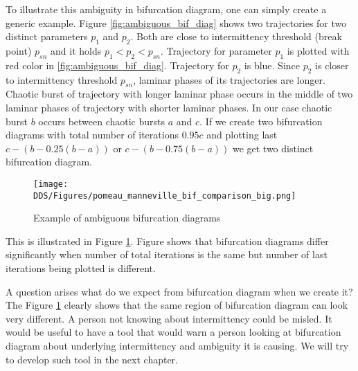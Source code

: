 To illustrate this ambiguity in bifurcation diagram, one can simply create a generic example.
Figure \ref{fig:ambiguous_bif_diag} shows two trajectories for two distinct parameters $p_1$ and $p_2$.
Both are close to intermittency threshold (break point) $p_{sn}$ and it holds $p_1 < p_2 < p_{sn}$.
Trajectory for parameter $p_1$ is plotted with red color in \ref{fig:ambiguous_bif_diag}.
Trajectory for $p_2$ is blue.
Since $p_2$ is closer to intermittency threshold $p_{sn}$, laminar phases of its trajectories are longer.
Chaotic burst of trajectory with longer laminar phase occurs in the middle of two laminar phases of trajectory with shorter laminar phases.
In our case chaotic burst $b$ occurs between chaotic bursts $a$ and $c$.
If we create two bifurcation diagrams with total number of iterations $0.95 c$ and plotting last $c-(b-0.25(b-a))$ or $c-(b-0.75(b-a))$ we get two distinct bifurcation diagram.


\begin{figure}[!h]
    \centering
    \texttt{[image: DDS/Figures/pomeau\_manneville\_bif\_comparison\_big.png]}
    \caption{Example of ambiguous bifurcation diagrams}
    \label{fig:ambiguous_bif_diag_example}
\end{figure}

This is illustrated in Figure \ref{fig:ambiguous_bif_diag_example}.
Figure shows that bifurcation diagrams differ significantly when number of total iterations is the same but number of last iterations being plotted is different.
\par
A question arises what do we expect from bifurcation diagram when we create it?
The Figure \ref{fig:ambiguous_bif_diag_example} clearly shows that the same region of bifurcation diagram can look very different.
A person not knowing about intermittency could be misled.
It would be useful to have a tool that would warn a person looking at bifurcation diagram about underlying intermittency and ambiguity it is causing.
We will try to develop such tool in the next chapter.

\endinput